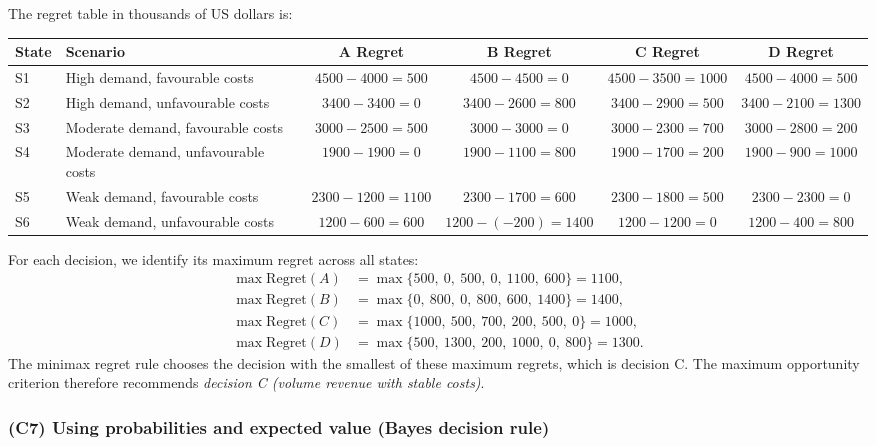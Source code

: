 The regret table in thousands of US dollars is:
\begin{table}[h!]
	\centering
	\begin{tabularx}{\linewidth}{@{}lYcccc@{}}
		\toprule
		State & Scenario & A Regret & B Regret & C Regret & D Regret \\
		\midrule
		S1 & High demand, favourable costs & \(4500-4000=500\) & \(4500-4500=0\) & \(4500-3500=1000\) & \(4500-4000=500\) \\
		S2 & High demand, unfavourable costs & \(3400-3400=0\) & \(3400-2600=800\) & \(3400-2900=500\) & \(3400-2100=1300\) \\
		S3 & Moderate demand, favourable costs & \(3000-2500=500\) & \(3000-3000=0\) & \(3000-2300=700\) & \(3000-2800=200\) \\
		S4 & Moderate demand, unfavourable costs & \(1900-1900=0\) & \(1900-1100=800\) & \(1900-1700=200\) & \(1900-900=1000\) \\
		S5 & Weak demand, favourable costs & \(2300-1200=1100\) & \(2300-1700=600\) & \(2300-1800=500\) & \(2300-2300=0\) \\
		S6 & Weak demand, unfavourable costs & \(1200-600=600\) & \(1200-(-200)=1400\) & \(1200-1200=0\) & \(1200-400=800\) \\
		\bottomrule
	\end{tabularx}
\end{table}

For each decision, we identify its maximum regret across all states:
\[
\begin{aligned}
\max \text{Regret}(A) &= \max\{500,\ 0,\ 500,\ 0,\ 1100,\ 600\}=1100,\\
\max \text{Regret}(B) &= \max\{0,\ 800,\ 0,\ 800,\ 600,\ 1400\}=1400,\\
\max \text{Regret}(C) &= \max\{1000,\ 500,\ 700,\ 200,\ 500,\ 0\}=1000,\\
\max \text{Regret}(D) &= \max\{500,\ 1300,\ 200,\ 1000,\ 0,\ 800\}=1300.
\end{aligned}
\]
The minimax regret rule chooses the decision with the smallest of these maximum regrets, which is decision C. The maximum
opportunity criterion therefore recommends \emph{decision C (volume revenue with stable costs)}.

\subsubsection{(C7) Using probabilities and expected value (Bayes decision rule)}\label{subsubsec:example3-c7}

